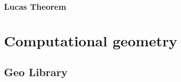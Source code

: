 \documentclass[11pt]{report}
\begin{document}
\subsection{Lucas Theorem}



\chapter{Computational geometry}
\section{Geo Library}

\end{document}
